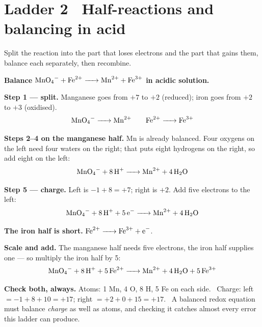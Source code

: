 \documentclass{apchem-worksheet}
\begin{document}
\section*{\sffamily Ladder 2 \textbullet\ Half-reactions and balancing
in acid}

Split the reaction into the part that loses electrons and the part that
gains them, balance each separately, then recombine.

\begin{center}
\end{center}

\begin{workedexample}
\textbf{Balance $\ce{MnO4- + Fe^2+ -> Mn^2+ + Fe^3+}$ in acidic
solution.}

\textbf{Step 1 --- split.} Manganese goes from $+7$ to $+2$ (reduced);
iron goes from $+2$ to $+3$ (oxidised).
\[ \ce{MnO4- -> Mn^2+}
   \qquad
   \ce{Fe^2+ -> Fe^3+} \]

\textbf{Steps 2--4 on the manganese half.} Mn is already balanced. Four
oxygens on the left need four waters on the right; that puts eight
hydrogens on the right, so add eight  on the left:
\[ \ce{MnO4- + 8H+ -> Mn^2+ + 4H2O} \]

\textbf{Step 5 --- charge.} Left is $-1 + 8 = +7$; right is $+2$. Add
five electrons to the left:
\[ \ce{MnO4- + 8H+ + 5e- -> Mn^2+ + 4H2O} \]

\textbf{The iron half is short.} $\ce{Fe^2+ -> Fe^3+ + e-}$.

\textbf{Scale and add.} The manganese half needs five electrons, the
iron half supplies one --- so multiply the iron half by 5:
\[ \ce{MnO4- + 8H+ + 5Fe^2+ -> Mn^2+ + 4H2O + 5Fe^3+} \]

\textbf{Check both, always.} Atoms: 1 Mn, 4 O, 8 H, 5 Fe on each side.
\checkmark\ Charge: left $= -1 + 8 + 10 = +17$; right $= +2 + 0 + 15 =
+17$. \checkmark\ A balanced redox equation must balance
\emph{charge} as well as atoms, and checking it catches almost every
error this ladder can produce.
\end{workedexample}
\end{document}

